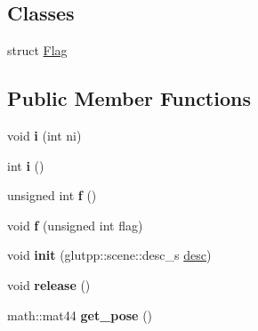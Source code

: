 \subsection*{\-Classes}
\begin{DoxyCompactItemize}
\item 
struct \hyperlink{structglutpp_1_1scene_1_1scene_1_1Flag}{\-Flag}
\end{DoxyCompactItemize}
\subsection*{\-Public \-Member \-Functions}
\begin{DoxyCompactItemize}
\item 
\hypertarget{classglutpp_1_1scene_1_1scene_abe1fa6d1512bfd84e91f9192e7c743ca}{void {\bfseries i} (int ni)}\label{classglutpp_1_1scene_1_1scene_abe1fa6d1512bfd84e91f9192e7c743ca}

\item 
\hypertarget{classglutpp_1_1scene_1_1scene_abbc88704970f055844e5f06453178dcb}{int {\bfseries i} ()}\label{classglutpp_1_1scene_1_1scene_abbc88704970f055844e5f06453178dcb}

\item 
\hypertarget{classglutpp_1_1scene_1_1scene_acb8ef22577d6d70aef89faf02c671d77}{unsigned int {\bfseries f} ()}\label{classglutpp_1_1scene_1_1scene_acb8ef22577d6d70aef89faf02c671d77}

\item 
\hypertarget{classglutpp_1_1scene_1_1scene_a25b3ffec412aa55a88d4c4fb6a1c7a3b}{void {\bfseries f} (unsigned int flag)}\label{classglutpp_1_1scene_1_1scene_a25b3ffec412aa55a88d4c4fb6a1c7a3b}

\item 
\hypertarget{classglutpp_1_1scene_1_1scene_ac204eb31618e2fd30c962c49e3767e25}{void {\bfseries init} (glutpp\-::scene\-::desc\-\_\-s \hyperlink{classglutpp_1_1scene_1_1desc}{desc})}\label{classglutpp_1_1scene_1_1scene_ac204eb31618e2fd30c962c49e3767e25}

\item 
\hypertarget{classglutpp_1_1scene_1_1scene_a5de02f6d7763af6ad7b5fb8e57499a65}{void {\bfseries release} ()}\label{classglutpp_1_1scene_1_1scene_a5de02f6d7763af6ad7b5fb8e57499a65}

\item 
\hypertarget{classglutpp_1_1scene_1_1scene_aa27e95117fb9b51657be1a2d29acdaba}{math\-::mat44 {\bfseries get\-\_\-pose} ()}\label{classglutpp_1_1scene_1_1scene_aa27e95117fb9b51657be1a2d29acdaba}


\end{DoxyCompactItemize}
